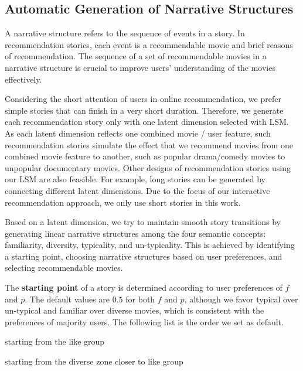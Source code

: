\documentclass{vgtc}                          %
\begin{document}
\subsection{Automatic Generation of Narrative Structures}

A narrative structure refers to the sequence of events in a story.
In recommendation stories, each event is a recommendable movie and brief reasons of recommendation. 
The sequence of a set of recommendable movies in a narrative structure is crucial to improve users' understanding of the movies effectively.

Considering the short attention of users in online recommendation, we prefer simple stories that can finish in a very short duration. Therefore, we generate each recommendation story only with one latent dimension selected with LSM.
As each latent dimension reflects one combined movie / user feature, such recommendation stories simulate the effect that we recommend movies from one combined movie feature to another, such as popular drama/comedy movies to unpopular documentary movies.
Other designs of recommendation stories using our LSM are also feasible.
For example, long stories can be generated by connecting different latent dimensions. 
Due to the focus of our interactive recommendation approach, we only use short stories in this work.

Based on a latent dimension, we try to maintain smooth story transitions by generating linear narrative structures among the four semantic concepts: familiarity, diversity, typicality, and un-typicality.
This is achieved by identifying a starting point, choosing narrative structures based on user preferences, and selecting recommendable movies.

The \textbf{starting point} of a story is determined according to user preferences of $f$ and $p$.
The default values are $0.5$ for both $f$ and $p$, although we favor typical over un-typical and familiar over diverse movies, which is consistent with the preferences of majority users.
The following list is the order we set as default.

\vspace{+1mm}
 starting from the like group

\vspace{+1mm}
 starting from the diverse zone closer to like group
\end{document}
